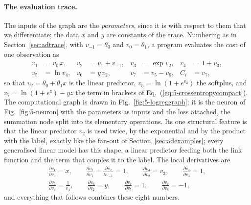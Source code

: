 \paragraph{The evaluation trace.}
The inputs of the graph are the \emph{parameters}, since it is with respect
to them that we differentiate; the data $x$ and $y$ are constants of the
trace.  Numbering as in Section~\ref{sec:adtrace}, with $v_{-1}=\theta_0$
and $v_0=\theta_1$, a program evaluates the cost of one observation as
\begin{equation}
  \begin{aligned}
    v_1 &= v_0\,x, & v_2 &= v_1 + v_{-1}, & v_3 &= \exp v_2, & v_4 &= 1+v_3,\\
    v_5 &= \ln v_4, & v_6 &= y\,v_2, & v_7 &= v_5 - v_6, & C_i &= v_7 ,
  \end{aligned}
  \label{eq:5-adtrace}
\end{equation}
so that $v_2=\theta_0+\theta_1x$ is the linear predictor, $v_5=\ln(1+e^{v_2})$
the softplus, and $v_7=\ln(1+e^{z})-yz$ the term in brackets of
Eq.~(\ref{eq:5-crossentropycompact}).  The computational graph is drawn in
Fig.~\ref{fig:5-logreggraph}; it is the neuron of Fig.~\ref{fig:5-neuron}
with the parameters as inputs and the loss attached, the summation node
split into its elementary operations.  Its one structural feature is that the linear
predictor $v_2$ is used twice, by the exponential and by the product with
the label, exactly like the fan-out of Section~\ref{sec:adexamples}; every
generalised linear model has this shape, a linear predictor feeding both the
link function and the term that couples it to the label.  The local
derivatives are
\begin{equation}
  \begin{gathered}
  \frac{\partial v_1}{\partial v_0}=x,\qquad
  \frac{\partial v_2}{\partial v_1}=\frac{\partial v_2}{\partial v_{-1}}=1,\qquad
  \frac{\partial v_3}{\partial v_2}=v_3,\qquad
  \frac{\partial v_4}{\partial v_3}=1,\\
  \frac{\partial v_5}{\partial v_4}=\frac{1}{v_4},\qquad
  \frac{\partial v_6}{\partial v_2}=y,\qquad
  \frac{\partial v_7}{\partial v_5}=1,\qquad
  \frac{\partial v_7}{\partial v_6}=-1 ,
  \end{gathered}
  \label{eq:5-adlocal}
\end{equation}
and everything that follows combines these eight numbers.

